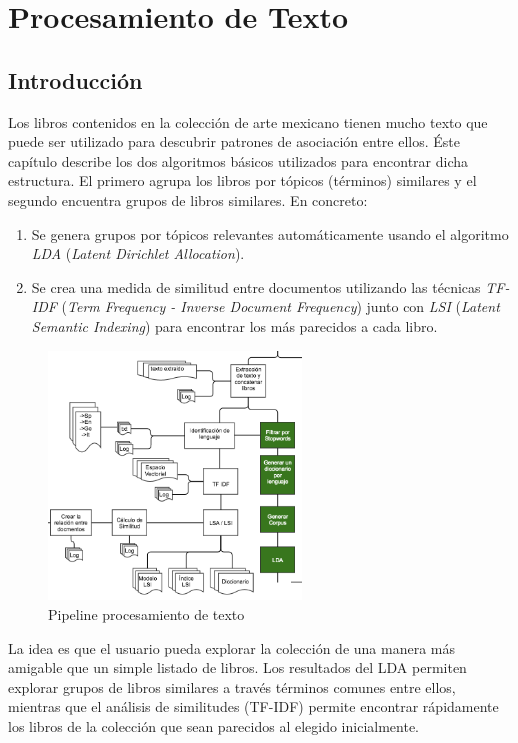 \chapter{Procesamiento de Texto }
\label{cap_txt}
\section{Introducción}

Los libros contenidos en la colección  de arte mexicano tienen mucho texto que puede ser utilizado para descubrir patrones de asociación entre ellos. Éste capítulo describe los dos algoritmos básicos utilizados para encontrar dicha estructura. El primero agrupa los libros por tópicos (términos) similares y el segundo encuentra grupos de libros similares. En concreto:

\begin{enumerate}
\item
  Se genera grupos por tópicos relevantes automáticamente usando el algoritmo
  \emph{LDA} (\emph{Latent Dirichlet Allocation}).
\item
  Se crea una medida de similitud entre documentos utilizando las técnicas \emph{TF-IDF} (\emph{Term Frequency - Inverse Document Frequency}) junto con \emph{LSI} (\emph{Latent Semantic Indexing}) para encontrar los más parecidos a cada libro.

\end{enumerate}

\begin{figure}[H]
\centering
\includegraphics[width=0.6\textwidth]{Figures/pipeline_text.png}
\caption{Pipeline procesamiento de texto}
\end{figure}

La idea es que el usuario pueda explorar la colección de una manera más amigable que un simple listado de  libros. Los resultados del LDA permiten explorar grupos de libros similares a través  términos comunes entre ellos, mientras que el análisis de similitudes (TF-IDF) permite encontrar rápidamente los libros de la colección que sean parecidos al elegido inicialmente.

